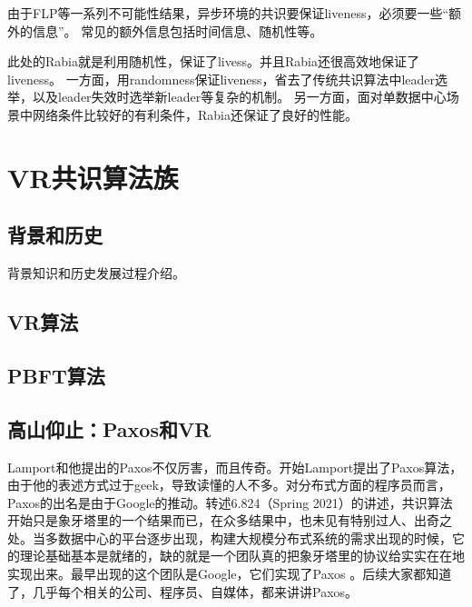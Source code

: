 \documentclass[UTF8]{ctexrep}
\begin{document}
由于FLP等一系列不可能性结果，异步环境的共识要保证liveness，必须要一些“额外的信息”。
常见的额外信息包括时间信息、随机性等。

此处的Rabia就是利用随机性，保证了livess。并且Rabia还很高效地保证了liveness。
一方面，用randomness保证liveness，省去了传统共识算法中leader选举，以及leader失效时选举新leader等复杂的机制。
另一方面，面对单数据中心场景中网络条件比较好的有利条件，Rabia还保证了良好的性能。



\chapter{VR共识算法族}

\section{背景和历史}

背景知识和历史发展过程介绍\cite[Chap 7]{Charron10}。

\section{VR算法}


\section{PBFT算法}


\section{高山仰止：Paxos和VR}

Lamport和他提出的Paxos不仅厉害，而且传奇。开始Lamport提出了Paxos算法，由于他的表述方式过于geek，导致读懂的人不多。对分布式方面的程序员而言，Paxos的出名是由于Google的推动。转述6.824（Spring 2021）的讲述，共识算法开始只是象牙塔里的一个结果而已，在众多结果中，也未见有特别过人、出奇之处。当多数据中心的平台逐步出现，构建大规模分布式系统的需求出现的时候，它的理论基础基本是就绪的，缺的就是一个团队真的把象牙塔里的协议给实实在在地实现出来。最早出现的这个团队是Google，它们实现了Paxos \cite{Chandra07}。后续大家都知道了，几乎每个相关的公司、程序员、自媒体，都来讲讲Paxos。
\end{document}
